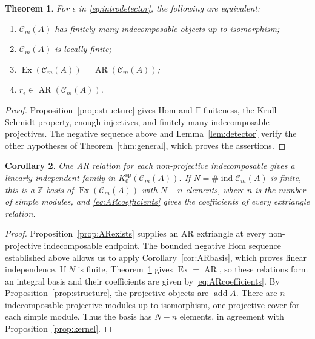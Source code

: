 \documentclass[pdflatex,sn-mathphys-num]{sn-jnl}
\numberwithin{equation}{section}
\newtheorem{theorem}{Theorem}[section]
\newtheorem{corollary}[theorem]{Corollary}
\theoremstyle{definition}
\theoremstyle{remark}\newtheorem{remark}[theorem]{Remark}
\newcommand{\C}{\mathcal C}
\newcommand{\E}{\mathbb E}
\newcommand{\ind}{\operatorname{ind}}
\newcommand{\add}{\operatorname{add}}
\newcommand{\Ex}{\operatorname{Ex}}
\newcommand{\AR}{\operatorname{AR}}
\newcommand{\ksp}{K_0^{\mathrm{sp}}}
\begin{document}
\begin{theorem}\label{thm:finite}
For $\epsilon$ in \eqref{eq:introdetector}, the following are equivalent:
\begin{enumerate}
\item $\C_m(A)$ has finitely many indecomposable objects up to isomorphism;
\item $\C_m(A)$ is locally finite;
\item $\Ex(\C_m(A))=\AR(\C_m(A))$;
\item $r_\epsilon\in\AR(\C_m(A))$.
\end{enumerate}
\end{theorem}
\begin{proof}
Proposition~\ref{prop:structure} gives Hom and $\E$ finiteness,
the Krull--Schmidt property, enough injectives, and finitely many
indecomposable projectives. The negative sequence above and
Lemma~\ref{lem:detector} verify the other hypotheses of
Theorem~\ref{thm:general}, which proves the assertions.
\end{proof}

\begin{corollary}\label{cor:modulebasis}
One AR relation for each non-projective indecomposable gives a linearly
independent family in $\ksp(\C_m(A))$. If $N=\#\ind\C_m(A)$ is finite,
this is a $\mathbb Z$-basis of $\Ex(\C_m(A))$ with $N-n$ elements, where $n$
is the number of simple modules, and \eqref{eq:ARcoefficients} gives
the coefficients of every extriangle relation.
\end{corollary}
\begin{proof}
Proposition~\ref{prop:ARexists} supplies an AR extriangle at every
non-projective indecomposable endpoint. The bounded negative Hom
sequence established above allows us to apply
Corollary~\ref{cor:ARbasis}, which proves linear independence.
If $N$ is finite, Theorem~\ref{thm:finite} gives $\Ex=\AR$, so
these relations form an integral basis and their coefficients are
given by \eqref{eq:ARcoefficients}. By
Proposition~\ref{prop:structure}, the projective objects are $\add A$.
There are $n$ indecomposable projective modules up to isomorphism,
one projective cover for each simple module. Thus the basis has
$N-n$ elements, in agreement with Proposition~\ref{prop:kernel}.
\end{proof}
\end{document}
